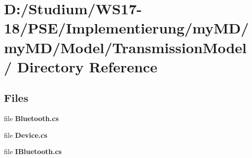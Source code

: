 \hypertarget{dir_D_3A_2FStudium_2FWS17_2D18_2FPSE_2FImplementierung_2FmyMD_2FmyMD_2FModel_2FTransmissionModel_2F}{
\section{D:/Studium/WS17-18/PSE/Implementierung/my\-MD/my\-MD/Model/Transmission\-Model/ Directory Reference}
\label{dir_D_3A_2FStudium_2FWS17_2D18_2FPSE_2FImplementierung_2FmyMD_2FmyMD_2FModel_2FTransmissionModel_2F}
}


\subsection*{Files}
\begin{CompactItemize}
\item 
file {\bf Bluetooth.cs}
\item 
file {\bf Device.cs}
\item 
file {\bf IBluetooth.cs}
\end{CompactItemize}

